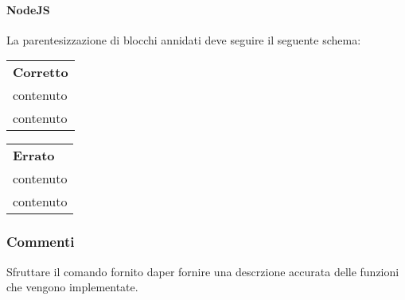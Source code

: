 \paragraph{NodeJS}
La parentesizzazione di blocchi annidati deve seguire il seguente schema:\\

\begin{minipage}{0.45\textwidth}
	\begin{tabular}{p{\textwidth}}	
		\textbf{Corretto}
		\begin{lstlisting}
		class Example {
			constructor {
			\\contenuto
			}
			
			data() {	
				fetchData() {
				\\contenuto
				}	
			}
		}
		\end{lstlisting}
	\end{tabular}
\end{minipage}
\hfill
\begin{minipage}{0.45\textwidth}
	\begin{tabular}{|p{\textwidth}}
		\textbf{Errato}
		\begin{lstlisting}	
		class Example {
		constructor {
		\\contenuto
		}
		
		data() {	
			fetchData() {
			\\contenuto
			}	
		}
		}		
	
		\end{lstlisting}
	\end{tabular}
	
\end{minipage}
\subsubsection{Commenti}
Sfruttare il comando fornito daper fornire una descrzione accurata delle funzioni che vengono implementate.\\

